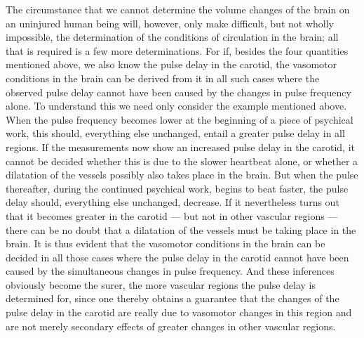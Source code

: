 \documentclass[12pt,a4paper,openany]{book}
\newcommand{\opage}[1]{\marginnote{\footnotesize\textit{[#1]}}}
\begin{document}
The circumstance that we cannot determine the volume changes of the brain on an
\setcounter{footnote}{0}%
\opage{280}uninjured human being will, however,
only make difficult, but not wholly impossible, the determination
of the conditions of circulation in the brain; all that is required is a few
more determinations. For if, besides the four quantities mentioned
above, we also know the pulse delay in the carotid,
the vasomotor conditions in the brain can be derived from it in all such
cases where the observed pulse delay cannot
have been caused by the changes in pulse frequency alone.
To understand this we need only consider the example mentioned
above. When the pulse frequency becomes lower at the beginning
of a piece of psychical work, this should, everything else unchanged,
entail a greater pulse delay in all regions.
If the measurements now show an increased pulse delay in the carotid,
it cannot be decided whether this is due to the slower
heartbeat alone, or whether a dilatation of the vessels possibly also takes
place in the brain. But when the pulse thereafter, during
the continued psychical work, begins to beat faster,
the pulse delay should, everything else unchanged, decrease. If
it nevertheless turns out that it becomes greater in the carotid --- but
not in other vascular regions --- there can be no doubt
that a dilatation of the vessels must be taking place in the brain. It is
thus evident that the vasomotor conditions in the brain
can be decided in all those cases where the pulse delay in the carotid
cannot have been caused by the simultaneous changes
in pulse frequency. And these inferences obviously become the
surer, the more vascular regions the pulse delay is determined
for, since one thereby obtains a guarantee that the changes of the
pulse delay in the carotid are really due to vasomotor changes
in this region and are not merely secondary
effects of greater changes in other vascular regions.
\end{document}

